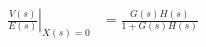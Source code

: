 \begin {align}[] \left .\frac {V(s)}{E(s)}\right |_{X(s) = 0} &= \frac {G(s)H(s)}{1+G(s)H(s)} \end {align} 
